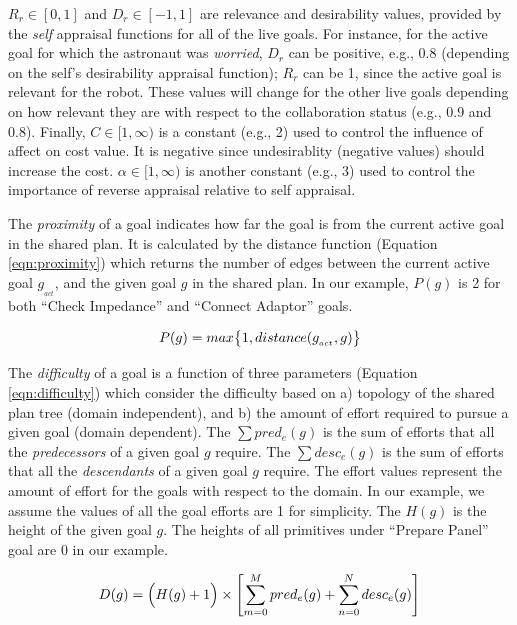 \documentclass[conference]{IEEEtran}
\begin{document}
$R_r\in[0,1]$ and $D_r\in[-1,1]$ are relevance and desirability values, provided
by the \textit{self} appraisal functions for all of the live goals. For
instance, for the active goal for which the astronaut was \textit{worried},
$D_r$ can be positive, e.g., 0.8 (depending on the self's desirability appraisal
function); $R_r$ can be 1, since the active goal is relevant for the robot.
These values will change for the other live goals depending on how
relevant they are with respect to the collaboration status (e.g., 0.9 and 0.8).
Finally, $C\in[1,\infty)$ is a constant (e.g., 2) used to control the influence
of affect on cost value. It is negative since undesirablity (negative values)
should increase the cost. $\alpha\in[1,\infty)$ is another constant (e.g., 3)
used to control the importance of reverse appraisal relative to self appraisal.

The \textit{proximity} of a goal indicates how far the goal is from the current
active goal in the shared plan. It is calculated by the distance function
(Equation \ref{eqn:proximity}) which returns the number of edges between the
current active goal $g_{_{act}}$, and the given goal $g$ in the shared plan. In
our example, $P(g)$ is 2 for both ``Check Impedance'' and ``Connect Adaptor''
goals.

\vspace*{-3mm}
\begin{equation}
P(g) = max\big\{1, distance(g_{_{act}},g)\big\}
\label{eqn:proximity}
\vspace*{-2mm}
\end{equation}

The \textit{difficulty} of a goal is a function of three parameters (Equation
\ref{eqn:difficulty}) which consider the difficulty based on a) topology of the
shared plan tree (domain independent), and b) the amount of effort required to
pursue a given goal (domain dependent). The $\sum pred_e(g)$ is the sum of
efforts that all the \textit{predecessors} of a given goal $g$ require. The
$\sum desc_e(g)$ is the sum of efforts that all the \textit{descendants} of a
given goal $g$ require. The effort values represent the amount of effort for the
goals with respect to the domain. In our example, we assume the values of all
the goal efforts are 1 for simplicity. The $H(g)$ is the height of the given
goal $g$. The heights of all primitives under ``Prepare Panel'' goal are 0 in
our example.

\vspace*{-5mm}
\begin{equation}
D(g) = \Big(H(g)+1\Big)\times\left[\sum\limits_{m=0}^{M} pred_e(g) +
\sum\limits_{n=0}^{N} desc_e(g)\right]
\label{eqn:difficulty}
\vspace*{-1mm}
\end{equation}
\end{document}
